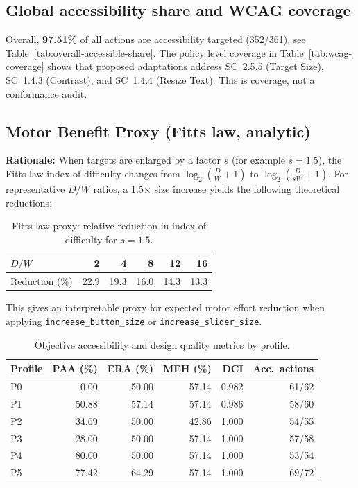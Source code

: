 \subsection{Global accessibility share and WCAG coverage}
Overall, \textbf{97.51\%} of all actions are accessibility targeted (352/361), see Table~\ref{tab:overall-accessible-share}. The policy level coverage in Table~\ref{tab:wcag-coverage} shows that proposed adaptations address SC~2.5.5 (Target Size), SC~1.4.3 (Contrast), and SC~1.4.4 (Resize Text). This is coverage, not a conformance audit.

\subsection{Motor Benefit Proxy (Fitts law, analytic)}
\textbf{Rationale:}
When targets are enlarged by a factor \(s\) (for example \(s{=}1.5\)), the Fitts law index of difficulty changes from \(\log_2(\frac{D}{W}+1)\) to \(\log_2(\frac{D}{sW}+1)\).
For representative \(D/W\) ratios, a 1.5\(\times\) size increase yields the following theoretical reductions:

\begin{table}[h]
\centering
\caption{Fitts law proxy: relative reduction in index of difficulty for \(s{=}1.5\).}
\begin{tabular}{lrrrrr}
\toprule
\(D/W\) & 2 & 4 & 8 & 12 & 16 \\
\midrule
Reduction (\%) & 22.9 & 19.3 & 16.0 & 14.3 & 13.3 \\
\bottomrule
\end{tabular}
\end{table}

This gives an interpretable proxy for expected motor effort reduction when applying \texttt{increase\_button\_size} or \texttt{increase\_slider\_size}.


\begin{table}[H]
\centering
\caption{Objective accessibility and design quality metrics by profile.}
\label{tab:obj-metrics}
\begin{tabular}{lrrrrr}
\toprule
\textbf{Profile} & \textbf{PAA (\%)} & \textbf{ERA (\%)} & \textbf{MEH (\%)} & \textbf{DCI} & \textbf{Acc.\ actions} \\
\midrule
P0 & 0.00 & 50.00 & 57.14 & 0.982 & 61/62 \\
P1 & 50.88 & 57.14 & 57.14 & 0.986 & 58/60 \\
P2 & 34.69 & 50.00 & 42.86 & 1.000 & 54/55 \\
P3 & 28.00 & 50.00 & 57.14 & 1.000 & 57/58 \\
P4 & 80.00 & 50.00 & 57.14 & 1.000 & 53/54 \\
P5 & 77.42 & 64.29 & 57.14 & 1.000 & 69/72 \\
\bottomrule
\end{tabular}
\end{table}

